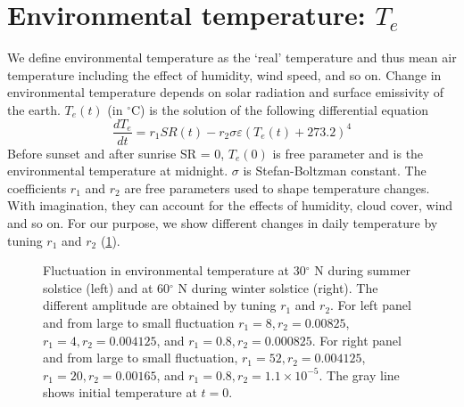 \documentclass[12pt]{article}
\begin{document}
\section*{Environmental temperature: $T_e$}
We define environmental temperature as the `real' temperature and thus mean air temperature including the effect of humidity, wind speed, and so on. 
Change in environmental temperature depends on solar radiation and surface emissivity of the earth.
$T_e(t)$ (in $^\circ$C) is the solution of the following differential equation
\[
	\frac{dT_e}{dt} = r_1 SR(t)  - r_2 \sigma  \varepsilon (T_e(t)+ 273.2)^4
\]
Before sunset and after sunrise SR = 0,  $T_e(0)$ is free parameter and is the environmental temperature at midnight. 
$\sigma$ is Stefan-Boltzman constant.
The coefficients $r_1$ and $r_2$ are free parameters used to shape temperature changes.
With imagination, they can account for the effects of humidity, cloud cover, wind and so on.
For our purpose, we show different changes in daily temperature by tuning $r_1$ and $r_2$ (\cref{fig:temp}).


\begin{figure}
\begin{center}
	\caption{Fluctuation in environmental temperature at 30$^\circ$ N during summer solstice (left) and at 60$^\circ$ N during winter solstice (right).
	The different amplitude are obtained by tuning $r_1$ and $r_2$. 
	For left panel and from large to small fluctuation $r_1 = 8 , r_2 = 0.00825$, $r_1 = 4 , r_2 = 0.004125$, and $r_1 = 0.8 , r_2 = 0.000825$.
	For right panel and  from large to small fluctuation, $r_1 = 52 , r_2 = 0.004125$, $r_1 = 20 , r_2 = 0.00165$, and $r_1 = 0.8 , r_2 =1.1 \times 10^{-5}$.
	The gray line shows initial temperature at $t = 0$.
	}
	\label{fig:temp}
\end{center}
\end{figure}
\end{document}
